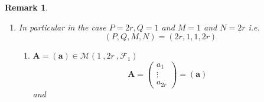 \documentclass[aps,preprint]{revtex4}
\newtheorem{remark}[theorem]{Remark}
\begin{document}
\begin{remark}
\begin{enumerate}
\begin{enumerate}
\item 
\begin{eqnarray}
\left( 
\begin{array}{cc}
a_{1}b_{1} & a_{2}b_{1} \\ 
a_{1}b_{2} & a_{2}b_{2}%
\end{array}%
\right) ^{t} &=&\left( 
\begin{array}{cc}
\left( a_{1}b_{1}\right) ^{t} & \left( a_{1}b_{2}\right) ^{t} \\ 
\left( a_{2}b_{1}\right) ^{t} & \left( a_{2}b_{2}\right) ^{t}%
\end{array}%
\right) =\left( \overset{}{\left( \boldsymbol{a}\right) ^{t}\otimes \left( 
\boldsymbol{b}\right) }\right) ^{t}=\left( \boldsymbol{b}\right) ^{t}\otimes
\left( \boldsymbol{a}\right) =\left( 
\begin{array}{cc}
b_{1} & b_{2}%
\end{array}%
\right) \otimes \left( 
\begin{array}{c}
a_{1} \\ 
a_{2}%
\end{array}%
\right) \\
&=&\left( 
\begin{array}{cc}
b_{1}\left( 
\begin{array}{c}
a_{1} \\ 
a_{2}%
\end{array}%
\right) & b_{2}\left( 
\begin{array}{c}
a_{1} \\ 
a_{2}%
\end{array}%
\right)%
\end{array}%
\right) =\left( 
\begin{array}{cc}
b_{1}a_{1} & b_{2}a_{1} \\ 
b_{1}a_{2} & b_{2}a_{2}%
\end{array}%
\right) .
\end{eqnarray}
\end{enumerate}

\item In particular in the case $P=2r,Q=1$ and $M=1$ and $N=2r$ i.e. 
\begin{equation}
\left( P,Q,M,N\right) =\left( 2r,1,1,2r\right)
\end{equation}

\begin{enumerate}
\item $\boldsymbol{A}=\left( \boldsymbol{a}\right) \in \mathcal{M}\left( 1\
,2r\ ,\mathcal{F}_{1}\right) $ 
\begin{equation}
\boldsymbol{A}=\left( 
\begin{array}{c}
a_{1} \\ 
\vdots \\ 
a_{2r}%
\end{array}%
\right) =\left( \boldsymbol{a}\right)
\end{equation}%
and


\end{enumerate}
\end{enumerate}
\end{remark}
\end{document}
